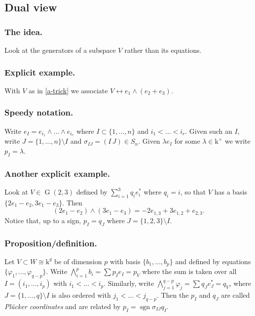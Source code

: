 \documentclass[10pt]{article}
\numberwithin{equation}{subsubsection}
\DeclareMathOperator{\G}{G}
\DeclareMathOperator{\sgn}{sgn}
\renewcommand{\k}{\mathrm{k}}
\begin{document}
        \subsection{Dual view}
        
            \subsubsection{The idea.} Look at the generators of a subspace $V$ rather than its equations.
            
            \subsubsection{Explicit example.} With $V$ as in \ref{a-trick} we associate $V\leftrightarrow e_1\wedge (e_2+e_3)$.
            
            \subsubsection{Speedy notation.} Write $e_I = e_{i_1}\wedge\ldots\wedge e_{i_r}$ where $I\subset\{1,\ldots,n\}$ and $i_1<\ldots<i_r$. Given such an $I$, write $J=\{1,\ldots,n\}\setminus I$ and $\sigma_{IJ}=(I\,J)\in S_n$. Given $\lambda e_I$ for some $\lambda\in\k^\times$ we write $p_I=\lambda$.
            
            \subsubsection{Another explicit example.} Look at $V\in\G(2,3)$ defined by $\sum_{i=1}^3 q_ie_i^*$ where $q_i=i$, so that $V$ has a basis $\{2e_1-e_2,3e_1-e_3\}$. Then \[(2e_1-e_2)\wedge (3e_1-e_3) = -2e_{1,3}+3e_{1,2}+e_{2,3}.\] Notice that, up to a sign, $p_I=q_J$ where $J=\{1,2,3\}\setminus I$.
            
            \subsubsection{Proposition/definition.} Let $V\subset W\cong\k^q$ be of dimension $p$ with basis $\{b_1,\ldots,b_p\}$ and defined by equations $\{\varphi_1,\ldots,\varphi_{q-p}\}$. Write $\bigwedge_{i=1}^pb_i = \sum p_Ie_I=p_V$ where the sum is taken over all $I=(i_1,\ldots,i_p)$ with $i_1<\ldots<i_p$. Similarly, write $\bigwedge_{j=1}^{q-p}\varphi_j=\sum q_Je_J^*=q_V$, where $J=\{1,\ldots,q\}\setminus I$ is also ordered with $j_1<\ldots<j_{q-p}$. Then the $p_I$ and $q_J$ are called \textit{Plücker coordinates} and are related by $p_I=\sgn\sigma_{IJ}q_I$.
            
\end{document}

